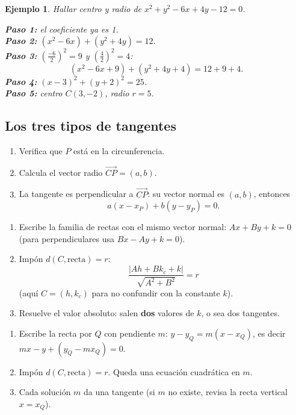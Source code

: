 \documentclass[11pt,a4paper]{article}
\theoremstyle{ej}
\newtheorem{ejemplo}{Ejemplo}[section]
\begin{document}
\begin{ejemplo}
Hallar centro y radio de $x^2+y^2-6x+4y-12=0$.

\textbf{Paso 1:} el coeficiente ya es 1.\\
\textbf{Paso 2:} $(x^2-6x)+(y^2+4y)=12$.\\
\textbf{Paso 3:} $\left(\tfrac{-6}{2}\right)^2=9$ y $\left(\tfrac{4}{2}\right)^2=4$:
\[ (x^2-6x+9)+(y^2+4y+4)=12+9+4. \]
\textbf{Paso 4:} $(x-3)^2+(y+2)^2=25$.\\
\textbf{Paso 5:} centro $C(3,-2)$, radio $r=5$.
\end{ejemplo}

\subsection{Los tres tipos de tangentes}

\begin{metodo}[title={Tipo A: tangente en un punto $P$ de la circunferencia}]
\begin{enumerate}[nosep]
  \item Verifica que $P$ está en la circunferencia.
  \item Calcula el vector radio $\overrightarrow{CP}=(a,b)$.
  \item La tangente es perpendicular a $\overrightarrow{CP}$: su vector normal es $(a,b)$, entonces
  \[ a(x-x_P)+b(y-y_P)=0. \]
\end{enumerate}
\end{metodo}

\begin{metodo}[title={Tipo B: tangentes paralelas (o perpendiculares) a una recta dada}]
\begin{enumerate}[nosep]
  \item Escribe la familia de rectas con el mismo vector normal: $Ax+By+k=0$
        (para perpendiculares usa $Bx-Ay+k=0$).
  \item Impón $d(C,\text{recta})=r$:
  \[ \frac{|Ah+Bk_c+k|}{\sqrt{A^2+B^2}}=r \]
  (aquí $C=(h,k_c)$ para no confundir con la constante $k$).
  \item Resuelve el valor absoluto: salen \textbf{dos} valores de $k$, o sea dos tangentes.
\end{enumerate}
\end{metodo}

\begin{metodo}[title={Tipo C: tangentes desde un punto exterior $Q$}]
\begin{enumerate}[nosep]
  \item Escribe la recta por $Q$ con pendiente $m$: $y-y_Q=m(x-x_Q)$, es decir $mx-y+(y_Q-mx_Q)=0$.
  \item Impón $d(C,\text{recta})=r$. Queda una ecuación cuadrática en $m$.
  \item Cada solución $m$ da una tangente (si $m$ no existe, revisa la recta vertical $x=x_Q$).
\end{enumerate}
\end{metodo}
\end{document}
